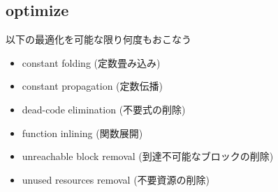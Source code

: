 \subsection{optimize}
\begin{frame}
\frametitlesec
以下の最適化を可能な限り何度もおこなう
\begin{itemize}
	\item constant folding (定数畳み込み)
	\item constant propagation (定数伝播)
	\item dead-code elimination (不要式の削除)
	\item function inlining (関数展開)
	\item unreachable block removal (到達不可能なブロックの削除)
	\item unused resources removal (不要資源の削除)
\end{itemize}
\end{frame}

